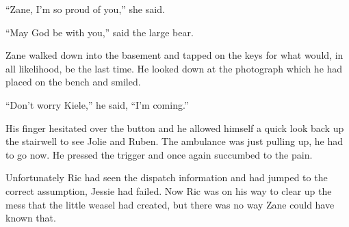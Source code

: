 ``Zane, I'm so proud of you,'' she said.

``May God be with you,'' said the large bear.

Zane walked down into the basement and tapped on the keys for what would, in all likelihood, be the last time.  He looked down at the photograph which he had placed on the bench and smiled. 

``Don't worry Kiele,'' he said, ``I'm coming.''

His finger hesitated over the button and he allowed himself a quick look back up the stairwell to see Jolie and Ruben.  The ambulance was just pulling up, he had to go now.  He pressed the trigger and once again succumbed to the pain.

Unfortunately Ric had seen the dispatch information and had jumped to the correct assumption, Jessie had failed.  Now Ric was on his way to clear up the mess that the little weasel had created, but there was no way Zane could have known that.



